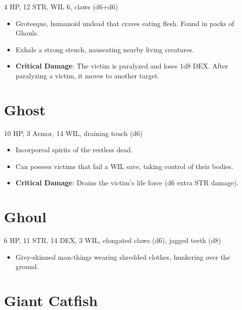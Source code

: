 \documentclass[
  10pt,
  american,
]{article}
\begin{document}
4 HP, 12 STR, WIL 6, claws (d6+d6)

\begin{samepage}
\begin{itemize}
\setlength\itemsep{-.5em}
\item Grotesque, humanoid undead that craves eating flesh. Found in packs of Ghouls.
\item Exhale a strong stench, nauseating nearby living creatures.
\item \textbf{Critical Damage}: The victim is paralyzed and loses 1d8 DEX. After paralyzing a victim, it moves to another target.
\end{itemize}
\end{samepage}

\hypertarget{ghost}{%
\section{Ghost}\label{ghost}}

10 HP, 3 Armor, 14 WIL, draining touch (d6)

\begin{samepage}
\begin{itemize}
\setlength\itemsep{-.5em}
\item Incorporeal spirits of the restless dead.
\item Can possess victims that fail a WIL save, taking control of their bodies.
\item \textbf{Critical Damage}: Drains the victim’s life force (d6 extra STR damage).
\end{itemize}
\end{samepage}

\hypertarget{ghoul}{%
\section{Ghoul}\label{ghoul}}

6 HP, 11 STR, 14 DEX, 3 WIL, elongated claws (d6), jagged teeth (d8)

\begin{samepage}
\begin{itemize}
\setlength\itemsep{-.5em}
\item Grey-skinned man-things wearing shredded clothes, hunkering over the ground.
\end{itemize}
\end{samepage}

\hypertarget{giant-catfish}{%
\section{Giant Catfish}\label{giant-catfish}}
\end{document}
